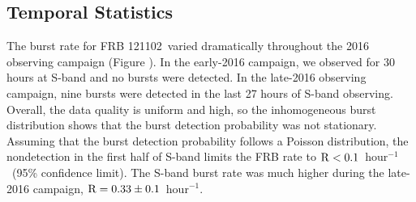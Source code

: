 \documentclass[twocolumn]{aastex61}
\newcommand{\frb}{FRB 121102}
\begin{document}
\subsection{Temporal Statistics}
\label{sec:temp}
The burst rate for \frb\ varied dramatically throughout the 2016 observing campaign (Figure \cite{fig:multi}). In the early-2016 campaign, we observed for 30 hours at S-band and no bursts were detected. In the late-2016 observing campaign, nine bursts were detected in the last 27 hours of S-band observing. Overall, the data quality is uniform and high, so the inhomogeneous burst distribution shows that the burst detection probability was not stationary. Assuming that the burst detection probability follows a Poisson distribution, the nondetection in the first half of S-band limits the FRB rate to $\rm{R}<0.1$\ hour$^{-1}$\ (95\% confidence limit). The S-band burst rate was much higher during the late-2016 campaign, $\rm{R}=0.33\pm0.1$\ hour$^{-1}$.

%
%
\end{document}
